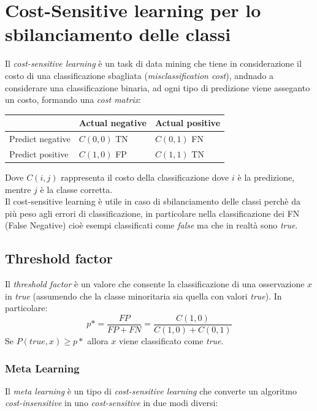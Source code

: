 \documentclass[italian,12pt,a4paper]{article}
\begin{document}
	\section{Cost-Sensitive learning per lo sbilanciamento delle classi}
	Il \textit{cost-sensitive learning} è un task di data mining che tiene in considerazione il costo di una classificazione sbagliata (\textit{misclassification cost}), andnado a considerare una classificazione binaria, ad ogni tipo di predizione viene asseganto un costo, formando una \textit{cost matrix}: \\
	\begin{center}
		\begin{tabularx}{0.8\textwidth} { 
				| >{\centering\arraybackslash}X 
				| >{\centering\arraybackslash}X 
				| >{\centering\arraybackslash}X | }
			\hline
			 & Actual negative & Actual positive \\
			\hline
			Predict negative & $C(0, 0)$ TN & $C(0, 1)$ FN \\
			\hline
			Predict positive  & $C(1, 0)$ FP & $C(1, 1)$ TN \\
			\hline
		\end{tabularx}
	\end{center}

	Dove $C(i, j)$ rappresenta il costo della classificazione dove $i$ è la predizione, mentre $j$ è la classe corretta. \\
	Il cost-sensitive learning è utile in caso di sbilanciamento delle classi perchè da più peso agli errori di classificazione, in particolare nella classificazione dei FN (False Negative) cioè esempi classificati come \textit{false} ma che in realtà sono \textit{true}.
	
	\subsection{Threshold factor}
	Il \textit{threshold factor} è un valore che consente la classificazione di una osservazione $x$ in \textit{true} (assumendo che la classe minoritaria sia quella con valori \textit{true}).
	\linebreak
	In particolare: $$p* = \frac{FP}{FP + FN} = \frac{C(1, 0)}{C(1, 0) + C(0, 1)}$$
	Se $P(true, x) \ge p*$ allora $x$ viene classificato come \textit{true}.
	
	\subsubsection{Meta Learning}
	Il \textit{meta learning} è un tipo di \textit{cost-sensitive learning} che converte un algoritmo \textit{cost-insensitive} in uno \textit{cost-sensitive} in due modi diversi:
	
\end{document}
